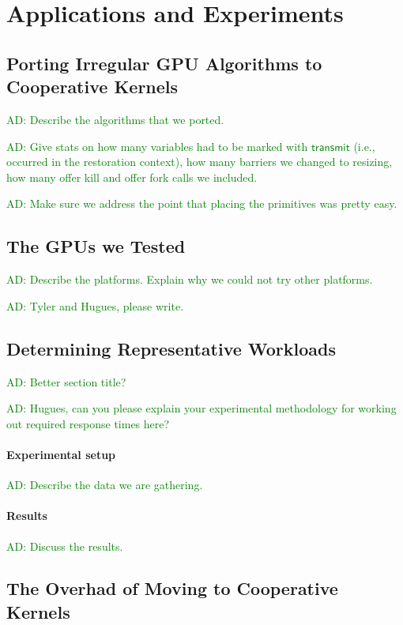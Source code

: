 \documentclass[nocopyrightspace,10pt]{sigplanconf}
\newcommand{\ADComment}[1]{\textcolor{green}{AD: #1}}
\newcommand{\transmit}{\mathsf{transmit}}
\begin{document}
\section{Applications and Experiments}\label{sec:experiments}

\subsection{Porting Irregular GPU Algorithms to Cooperative Kernels}\label{sec:portingalgorithms}

\ADComment{Describe the algorithms that we ported.}

\ADComment{Give stats on how many variables had to be marked with
  $\transmit$ (i.e., occurred in the restoration context), how many barriers we changed to resizing, how many offer kill and offer fork calls we included.}

\ADComment{Make sure we address the point that placing the primitives was pretty easy.}

\subsection{The GPUs we Tested}

\ADComment{Describe the platforms.  Explain why we could not try other
  platforms.}

\ADComment{Tyler and Hugues, please write.}

\subsection{Determining Representative Workloads}

\ADComment{Better section title?}

\ADComment{Hugues, can you please explain your experimental
  methodology for working out required response times here?}

\paragraph{Experimental setup}  \ADComment{Describe the data we are gathering.}

\paragraph{Results}  \ADComment{Discuss the results.}

\subsection{The Overhad of Moving to Cooperative Kernels}
\end{document}
